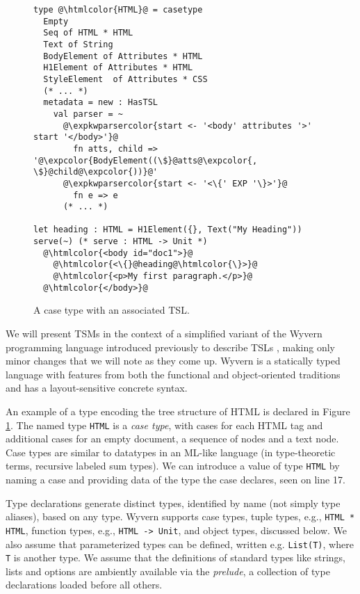 \documentclass{sig-alternate}
\newcommand{\htmlcolor}[1]{\textcolor[HTML]{339933}{#1}}
\newcommand{\expkwparsercolor}[1]{\textcolor[HTML]{336699}{#1}}
\newcommand{\expcolor}[1]{\textcolor[HTML]{FF0033}{#1}}
\newcommand{\mycaption}[1]{\vspace{-4px}\caption{#1}\vspace{-2px}}
\begin{document}
\begin{figure}[t!]
\begin{lstlisting}[style=wyvern]
type @\htmlcolor{HTML}@ = casetype 
  Empty
  Seq of HTML * HTML 
  Text of String
  BodyElement of Attributes * HTML
  H1Element of Attributes * HTML
  StyleElement  of Attributes * CSS
  (* ... *)
  metadata = new : HasTSL
    val parser = ~
      @\expkwparsercolor{start <- '<body' attributes '>' start '</body>'}@
        fn atts, child => '@\expcolor{BodyElement((\$}@atts@\expcolor{, \$}@child@\expcolor{))}@'
      @\expkwparsercolor{start <- '<\{' EXP '\}>'}@
        fn e => e
      (* ... *)

let heading : HTML = H1Element({}, Text("My Heading"))
serve(~) (* serve : HTML -> Unit *)
  @\htmlcolor{<body id="doc1">}@
    @\htmlcolor{<\{}@heading@\htmlcolor{\}>}@
    @\htmlcolor{<p>My first paragraph.</p>}@
  @\htmlcolor{</body>}@
\end{lstlisting}
\mycaption{A case type with an associated TSL.}
\label{f-htmltype}
\end{figure}
We will present TSMs in the context of a simplified variant of the Wyvern programming language introduced previously to describe TSLs  \cite{TSLs}, making only minor changes that we will note as they come up. Wyvern is a statically typed  language with features from both the functional and object-oriented traditions and has a layout-sensitive concrete syntax. 

An example of a type encoding the tree structure of HTML is declared in Figure \ref{f-htmltype}. The named type \verb|HTML| is a \emph{case type}, with cases for each HTML tag and additional cases for an empty document, a sequence of nodes and a text node. Case types are similar to datatypes in an ML-like language (in type-theoretic terms, recursive labeled sum types). 
We can introduce a value of type \verb|HTML| by naming a case and providing data of the type the case declares, seen on line 17.

Type declarations generate distinct types, identified by name (not simply type aliases), based on any type. Wyvern supports case types, tuple types, e.g., \verb|HTML * HTML|, function types, e.g., \verb|HTML -> Unit|, and object types, discussed below. We also assume that parameterized types can be defined, written e.g. \verb|List(T)|, where \verb|T| is another type. 
We assume that the definitions of standard  types like strings, lists and options are ambiently available via the \emph{prelude}, a collection of type declarations loaded before all others. 
\end{document}
